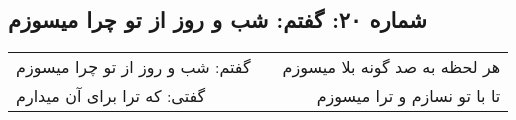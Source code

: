\begin{center}
\section*{شماره ۲۰: گفتم: شب و روز از تو چرا میسوزم}
\label{sec:020}
\begin{longtable}{l p{0.5cm} r}
گفتم: شب و روز از تو چرا میسوزم
&&
هر لحظه به صد گونه بلا میسوزم
\\
گفتی: که ترا برای آن میدارم
&&
تا با تو نسازم و ترا میسوزم
\\
\end{longtable}
\end{center}

